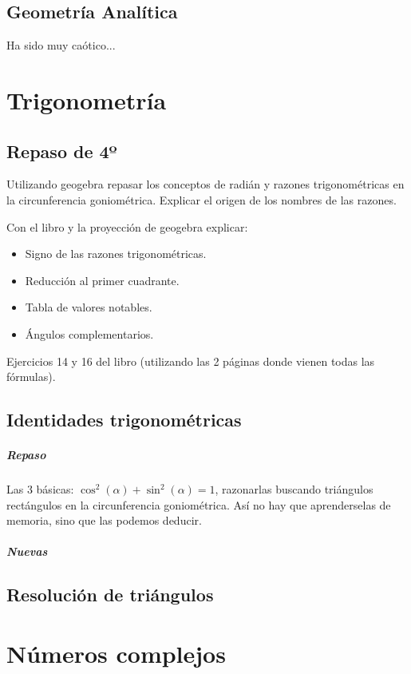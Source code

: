 \documentclass[palatino,nosec]{Docencia}
\begin{document}
\section{Geometría Analítica}

Ha sido muy caótico...

\chapter{Trigonometría}

\section{Repaso de 4º}

Utilizando geogebra repasar los conceptos de radián y razones trigonométricas en la circunferencia goniométrica.
Explicar el origen de los nombres de las razones.

Con el libro y la proyección de geogebra explicar:
\begin{itemize}
	\item Signo de las razones trigonométricas.
	\item Reducción al primer cuadrante.
	\item Tabla de valores notables.
	\item Ángulos complementarios.
\end{itemize}

Ejercicios 14 y 16 del libro (utilizando las 2 páginas donde vienen todas las fórmulas).

\section{Identidades trigonométricas}

\paragraph{Repaso}

Las 3 básicas: $\cos^2(α)+\sin^2(α) = 1$, razonarlas buscando triángulos rectángulos en la circunferencia goniométrica.
Así no hay que aprenderselas de memoria, sino que las podemos deducir.

\paragraph{Nuevas}

\section{Resolución de triángulos}

\chapter{Números complejos}

\printindex
\end{document}
